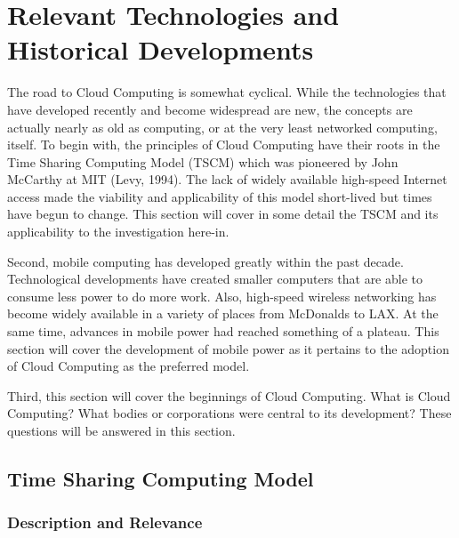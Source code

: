 \documentclass[12pt,oneside,letterpaper]{article}
\begin{document}
\section{Relevant Technologies and Historical Developments}

The road to Cloud Computing is somewhat cyclical.  While the technologies that
have developed recently and become widespread are new, the concepts are actually
nearly as old as computing, or at the very least networked computing, itself.
To begin with, the principles of Cloud Computing have their roots in the Time
Sharing Computing Model (TSCM) which was pioneered by John McCarthy at MIT
(Levy, 1994).  The lack of widely available high-speed Internet access made the
viability and applicability of this model short-lived but times have begun to
change.  This section will cover in some detail the TSCM and its applicability
to the investigation here-in.

Second, mobile computing has developed greatly within the past decade.
Technological developments have created smaller computers that are able to
consume less power to do more work.  Also, high-speed wireless networking has
become widely available in a variety of places from McDonalds to LAX.  At the
same time, advances in mobile power had reached something of a plateau.  This
section will cover the development of mobile power as it pertains to the
adoption of Cloud Computing as the preferred model.

Third, this section will cover the beginnings of Cloud Computing.  What is Cloud
Computing?  What bodies or corporations were central to its development?  These
questions will be answered in this section.

\subsection{Time Sharing Computing Model}

\subsubsection{Description and Relevance}
\end{document}
